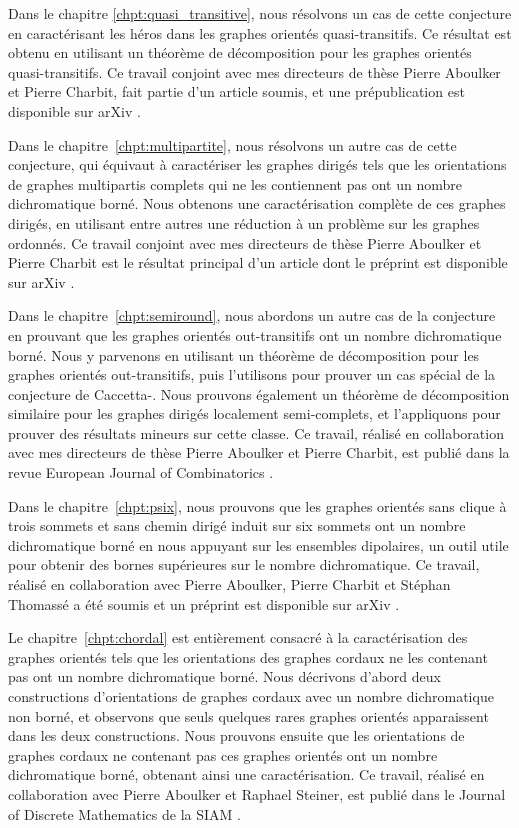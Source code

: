 \medskip
Dans le chapitre \ref{chpt:quasi_transitive}, nous résolvons un cas de cette conjecture en caractérisant les héros dans les graphes orientés quasi-transitifs. Ce résultat est obtenu en utilisant un théorème de décomposition pour les graphes orientés quasi-transitifs. Ce travail conjoint avec mes directeurs de thèse Pierre Aboulker et Pierre Charbit, fait partie d'un article soumis, et une prépublication est disponible sur arXiv \cite{AACmulti}.

\medskip

Dans le chapitre~\ref{chpt:multipartite}, nous résolvons un autre cas de cette conjecture, qui équivaut à caractériser les graphes dirigés tels que les orientations de graphes multipartis complets qui ne les contiennent pas ont un nombre dichromatique borné. Nous obtenons une caractérisation complète de ces graphes dirigés, en utilisant entre autres une réduction à un problème sur les graphes ordonnés. Ce travail conjoint avec mes directeurs de thèse Pierre Aboulker et Pierre Charbit est le résultat principal d'un article dont le préprint est disponible sur arXiv \cite{AACmulti}.

\medskip
Dans le chapitre~\ref{chpt:semiround}, nous abordons un autre cas de la conjecture en prouvant que les graphes orientés out-transitifs ont un nombre dichromatique borné. Nous y parvenons en utilisant un théorème de décomposition pour les graphes orientés out-transitifs, puis l'utilisons pour prouver un cas spécial de la conjecture de Caccetta-\Hag. Nous prouvons également un théorème de décomposition similaire pour les graphes dirigés localement semi-complets, et l'appliquons pour prouver des résultats mineurs sur cette classe. Ce travail, réalisé en collaboration avec mes directeurs de thèse Pierre Aboulker et Pierre Charbit, est publié dans la revue European Journal of Combinatorics \cite{AAC21}.

\medskip
Dans le chapitre~\ref{chpt:psix}, nous prouvons que les graphes orientés sans clique à trois sommets et sans chemin dirigé induit sur six sommets ont un nombre dichromatique borné en nous appuyant sur les ensembles dipolaires, un outil utile pour obtenir des bornes supérieures sur le nombre dichromatique. Ce travail, réalisé en collaboration avec Pierre Aboulker, Pierre Charbit et Stéphan Thomassé a été soumis et un préprint est disponible sur arXiv \cite{AACT22}.

\medskip
Le chapitre~\ref{chpt:chordal} est entièrement consacré à la caractérisation des graphes orientés tels que les orientations des graphes cordaux ne les contenant pas ont un nombre dichromatique borné. Nous décrivons d'abord deux constructions d'orientations de graphes cordaux avec un nombre dichromatique non borné, et observons que seuls quelques rares graphes orientés apparaissent dans les deux constructions. Nous prouvons ensuite que les orientations de graphes cordaux ne contenant pas ces graphes orientés ont un nombre dichromatique borné, obtenant ainsi une caractérisation. Ce travail, réalisé en collaboration avec Pierre Aboulker et Raphael Steiner, est publié dans le Journal of Discrete Mathematics de la SIAM \cite{AAS22}.

